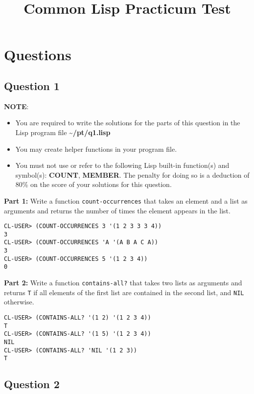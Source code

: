 \documentclass[11pt]{article}
\date{}
\title{Common Lisp Practicum Test}
\begin{document}
\maketitle
\section*{Questions}
\label{sec:org379d720}

\subsection*{Question 1}
\label{sec:orgf86c001}

\textbf{NOTE}:
\begin{itemize}
\item You are required to write the solutions for the parts of this question in the Lisp program file \textbf{\textasciitilde{}/pt/q1.lisp}
\item You may create helper functions in your program file.
\item You must not use or refer to the following Lisp built-in function(s) and symbol(s): \textbf{COUNT}, \textbf{MEMBER}. The penalty for doing so is a deduction of 80\% on the score of your solutions for this question.
\end{itemize}


\textbf{\textbf{Part 1:}} Write a function \texttt{count-occurrences} that takes an element
and a list as arguments and returns the number of times the element
appears in the list. 

\begin{verbatim}
CL-USER> (COUNT-OCCURRENCES 3 '(1 2 3 3 3 4))
3
CL-USER> (COUNT-OCCURRENCES 'A '(A B A C A))
3
CL-USER> (COUNT-OCCURRENCES 5 '(1 2 3 4))
0
\end{verbatim}


\textbf{\textbf{Part 2:}} Write a function \texttt{contains-all?} that takes two lists as
arguments and returns \texttt{T} if all elements of the first list are
contained in the second list, and \texttt{NIL} otherwise.

\begin{verbatim}
CL-USER> (CONTAINS-ALL? '(1 2) '(1 2 3 4))
T
CL-USER> (CONTAINS-ALL? '(1 5) '(1 2 3 4))
NIL
CL-USER> (CONTAINS-ALL? 'NIL '(1 2 3))
T
\end{verbatim}
\subsection*{Question 2}
\label{sec:org506aedb}
\end{document}
